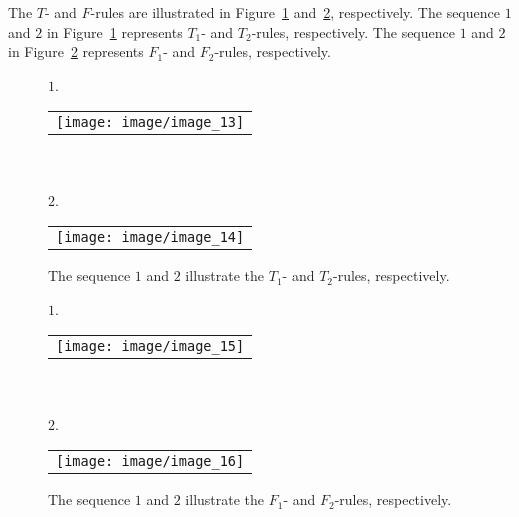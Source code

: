 \documentclass[a4paper,11pt]{article}
\begin{document}
The $T$- and $F$-rules are illustrated in Figure~\ref{image_13_14} and~\ref{image_15_16}, respectively.
The sequence $1$ and $2$ in Figure~\ref{image_13_14} represents $T_1$- and $T_2$-rules, respectively.
The sequence $1$ and $2$ in Figure~\ref{image_15_16} represents $F_1$- and $F_2$-rules, respectively.
\begin{figure}[!ht]
$1$.
\begin{tabular}[c]{l}
\texttt{[image: image/image\_13]}
\end{tabular}\\ \\

$2$.
\begin{tabular}[c]{l}
\texttt{[image: image/image\_14]}
\end{tabular}
\caption{The sequence $1$ and $2$ illustrate the $T_1$- and $T_2$-rules, respectively.}
\label{image_13_14}
\end{figure}
\begin{figure}[!ht]
$1$.
\begin{tabular}[c]{l}
\texttt{[image: image/image\_15]}
\end{tabular}\\ \\

$2$.
\begin{tabular}[c]{l}
\texttt{[image: image/image\_16]}
\end{tabular}
\caption{The sequence $1$ and $2$ illustrate the $F_1$- and $F_2$-rules, respectively.}
\label{image_15_16}
\end{figure}
\FloatBarrier
\end{document}
